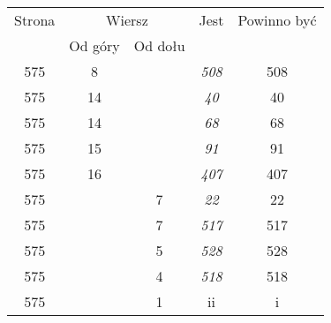 \documentclass[a4paper,11pt]{article}
\begin{document}
\begin{center}
  \begin{tabular}{|c|c|c|c|c|}
    \hline
    Strona & \multicolumn{2}{c|}{Wiersz} & Jest
    & Powinno być \\ \cline{2-3}
    & Od góry & Od dołu & & \\
    \hline
    575 & \hphantom{0}8 & & \textit{508} & 508 \\
    575 & 14 & & \textit{40} & 40 \\
    575 & 14 & & \textit{68} & 68 \\
    575 & 15 & & \textit{91} & 91 \\
    575 & 16 & & \textit{407} & 407 \\
    575 & & \hphantom{0}7 & \textit{22} & 22 \\
    575 & & \hphantom{0}7 & \textit{517} & 517 \\
    575 & & \hphantom{0}5 & \textit{528} & 528 \\
    575 & & \hphantom{0}4 & \textit{518} & 518 \\
    575 & & \hphantom{0}1 & ii & i \\

\end{tabular}
\end{center}
\end{document}
